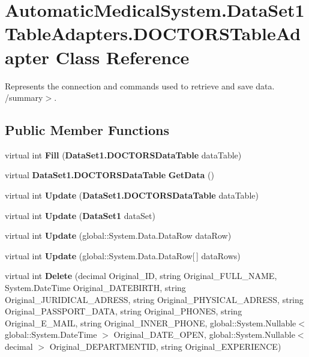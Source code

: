 \section{AutomaticMedicalSystem.DataSet1TableAdapters.DOCTORSTableAdapter Class Reference}
\label{class_automatic_medical_system_1_1_data_set1_table_adapters_1_1_d_o_c_t_o_r_s_table_adapter}
Represents the connection and commands used to retrieve and save data. /summary$>$.  


\subsection*{Public Member Functions}
\begin{CompactItemize}
\item 
virtual int \textbf{Fill} ({\bf DataSet1.DOCTORSDataTable} dataTable)\label{class_automatic_medical_system_1_1_data_set1_table_adapters_1_1_d_o_c_t_o_r_s_table_adapter_7db8bd3773b6ce294b249f93cc902b54}

\item 
virtual {\bf DataSet1.DOCTORSDataTable} \textbf{GetData} ()\label{class_automatic_medical_system_1_1_data_set1_table_adapters_1_1_d_o_c_t_o_r_s_table_adapter_5aed5d2d1045d47b47fd39a06fc5260b}

\item 
virtual int \textbf{Update} ({\bf DataSet1.DOCTORSDataTable} dataTable)\label{class_automatic_medical_system_1_1_data_set1_table_adapters_1_1_d_o_c_t_o_r_s_table_adapter_7b06ecb64712afc8dfc168827ab5d57a}

\item 
virtual int \textbf{Update} ({\bf DataSet1} dataSet)\label{class_automatic_medical_system_1_1_data_set1_table_adapters_1_1_d_o_c_t_o_r_s_table_adapter_989c81aaf350344231e0618a7868c07a}

\item 
virtual int \textbf{Update} (global::System.Data.DataRow dataRow)\label{class_automatic_medical_system_1_1_data_set1_table_adapters_1_1_d_o_c_t_o_r_s_table_adapter_07f559dbbbdbf5f52dabff9922eef63b}

\item 
virtual int \textbf{Update} (global::System.Data.DataRow[$\,$] dataRows)\label{class_automatic_medical_system_1_1_data_set1_table_adapters_1_1_d_o_c_t_o_r_s_table_adapter_fe45f6a1222df92cd97b7179aa7b41ab}

\item 
virtual int \textbf{Delete} (decimal Original\_\-ID, string Original\_\-FULL\_\-NAME, System.DateTime Original\_\-DATEBIRTH, string Original\_\-JURIDICAL\_\-ADRESS, string Original\_\-PHYSICAL\_\-ADRESS, string Original\_\-PASSPORT\_\-DATA, string Original\_\-PHONES, string Original\_\-E\_\-MAIL, string Original\_\-INNER\_\-PHONE, global::System.Nullable$<$ global::System.DateTime $>$ Original\_\-DATE\_\-OPEN, global::System.Nullable$<$ decimal $>$ Original\_\-DEPARTMENTID, string Original\_\-EXPERIENCE)\label{class_automatic_medical_system_1_1_data_set1_table_adapters_1_1_d_o_c_t_o_r_s_table_adapter_f8f767f10e2c0f4909b35b06be41bdf4}


\end{CompactItemize}
